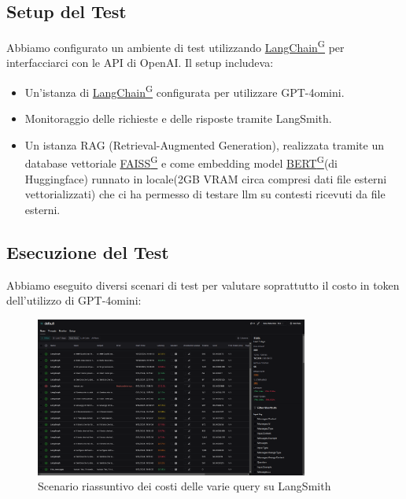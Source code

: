 \documentclass{article}
\begin{document}
\subsection{Setup del Test}
Abbiamo configurato un ambiente di test utilizzando \href{https://code7crusaders.github.io/docs/RTB/documentazione_interna/glossario.html#langchain}{LangChain\textsuperscript{G}} per interfacciarci con le API di OpenAI. Il setup includeva:
\begin{itemize}
    \item Un'istanza di \href{https://code7crusaders.github.io/docs/RTB/documentazione_interna/glossario.html#langchain}{LangChain\textsuperscript{G}} configurata per utilizzare GPT-4omini.
    \item Monitoraggio delle richieste e delle risposte tramite LangSmith.
    \item Un istanza RAG (Retrieval-Augmented Generation), realizzata tramite un database vettoriale \href{https://code7crusaders.github.io/docs/RTB/documentazione_interna/glossario.html#faiss}{FAISS\textsuperscript{G}} e come embedding model \href{https://code7crusaders.github.io/docs/RTB/documentazione_interna/glossario.html#bert-bidirectional-encoder-representations-from-transformers}{BERT\textsuperscript{G}}(di Huggingface) runnato in locale(2GB VRAM circa compresi dati file esterni vettorializzati) che ci ha permesso di testare llm su contesti ricevuti da file esterni.
\end{itemize}

\subsection{Esecuzione del Test}
Abbiamo eseguito diversi scenari di test per valutare soprattutto il costo in token dell'utilizzo di GPT-4omini:
\begin{figure}[H]
    \centering
    \includegraphics[width=0.8\textwidth]{img/testing_langsmith.png}
    \caption{Scenario riassuntivo dei costi delle varie query su LangSmith}
    \label{fig:LangSmith_costs_summary}
\end{figure}
\end{document}
